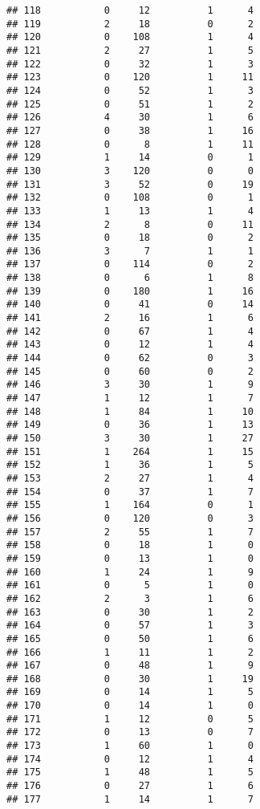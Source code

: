 \documentclass[]{article}
\begin{document}
\begin{verbatim}
## 118           0     12          1      4
## 119           2     18          0      2
## 120           0    108          1      4
## 121           2     27          1      5
## 122           0     32          1      3
## 123           0    120          1     11
## 124           0     52          1      3
## 125           0     51          1      2
## 126           4     30          1      6
## 127           0     38          1     16
## 128           0      8          1     11
## 129           1     14          0      1
## 130           3    120          0      0
## 131           3     52          0     19
## 132           0    108          0      1
## 133           1     13          1      4
## 134           2      8          0     11
## 135           0     18          0      2
## 136           3      7          1      1
## 137           0    114          0      2
## 138           0      6          1      8
## 139           0    180          1     16
## 140           0     41          0     14
## 141           2     16          1      6
## 142           0     67          1      4
## 143           0     12          1      4
## 144           0     62          0      3
## 145           0     60          0      2
## 146           3     30          1      9
## 147           1     12          1      7
## 148           1     84          1     10
## 149           0     36          1     13
## 150           3     30          1     27
## 151           1    264          1     15
## 152           1     36          1      5
## 153           2     27          1      4
## 154           0     37          1      7
## 155           1    164          0      1
## 156           0    120          0      3
## 157           2     55          1      7
## 158           0     18          1      0
## 159           0     13          1      0
## 160           1     24          1      9
## 161           0      5          1      0
## 162           2      3          1      6
## 163           0     30          1      2
## 164           0     57          1      3
## 165           0     50          1      6
## 166           1     11          1      2
## 167           0     48          1      9
## 168           0     30          1     19
## 169           0     14          1      5
## 170           0     14          1      0
## 171           1     12          0      5
## 172           0     13          0      7
## 173           1     60          1      0
## 174           0     12          1      4
## 175           1     48          1      5
## 176           0     27          1      6
## 177           1     14          1      7

\end{verbatim}
\end{document}

